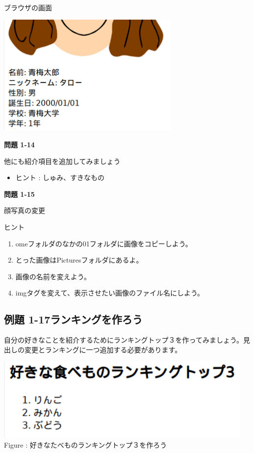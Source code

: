 \documentclass[a4paper,12pt]{jarticle}
\begin{document}
\bigskip

\bigskip



ブラウザの画面

\includegraphics[width=9cm,height=6cm]{textbook-img173.png}



\clearpage
{\bfseries
  問題 1-14}

他にも紹介項目を追加してみましょう

\begin{itemize}
  \item ヒント : しゅみ、すきなもの
\end{itemize}
{\bfseries
問題 1-15}

顔写真の変更

ヒント

\begin{enumerate}
  \item
        omeフォルダのなかの01フォルダに画像をコピーしよう。
  \item とった画像はPicturesフォルダにあるよ。
  \item 画像の名前を変えよう。
  \item
        imgタグを変えて、表示させたい画像のファイル名にしよう。
\end{enumerate}

\bigskip


\bigskip

\clearpage\subsection{例題 1-17ランキングを作ろう}
自分の好きなことを紹介するためにランキングトップ３を作ってみましょう。見出しの変更とランキングに一つ追加する必要があります。



\bigskip


\begin{minipage}{12.716cm}
  {\upshape
    \includegraphics[width=12.716cm,height=4.14cm]{textbook-img178.png}
    \newline
    Figure :
    好きなたべものランキングトップ３を作ろう}
\end{minipage}
\end{document}
